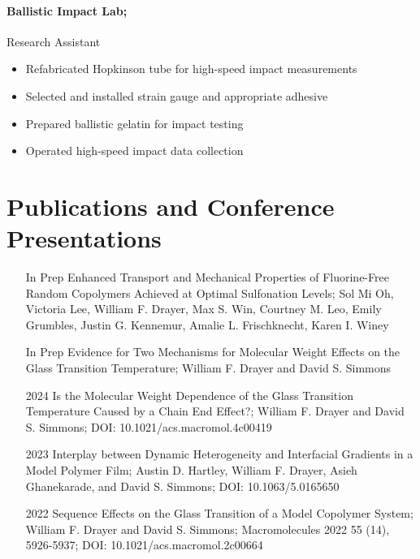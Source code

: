 \documentclass{my_cv}
\begin{document}
\paragraph{Ballistic Impact Lab;}
Research Assistant
\begin{itemize}
    \item Re\-fabricated Hopkins\-on tube for high-speed impact measurements
    \item Selected and installed strain gauge and appropriate adhesive
    \item Prepared ballistic gelatin for impact testing
    \item Operated high-speed impact data collection
\end{itemize}

\section{Publications and Conference Presentations}
\begin{itemize}
    \item[In Prep] Enhanced Transport and Mechanical Properties of Fluorine-Free Random Co\-polymers Achieved at Optimal Sulf\-o\-na\-tion Levels; Sol Mi Oh, Victoria Lee, William F. Drayer, Max S. Win, Courtney M. Leo, Emily Grumbles, Justin G. Kennemur, Amalie L. Frischknecht, Karen I. Winey
    \item[In Prep] Evidence for Two Mechanisms for Molecular Weight Effects on the Glass Transition Temperature; William F. Drayer and David S. Simmons
    \item[2024] Is the Molecular Weight Dependence of the Glass Transition Temperature Caused by a Chain End Effect?; William F. Drayer and David S. Simmons; DOI: 10.1021/acs.macromol.4c00419
    \item[2023] Interplay between Dynamic Heterogeneity and Inter\-facial Gradients in a Model Polymer Film; Austin D. Hartley, William F. Drayer, Asieh Ghanekarade, and David S. Simmons; DOI: 10.1063/5.0165650
    \item[2022] Sequence Effects on the Glass Transition of a Model Co\-polymer System; William F. Drayer and David S. Simmons; Macromolecules 2022 55 (14), 5926-5937; DOI: 10.1021/acs.macromol.2c00664
\end{itemize}
\end{document}
